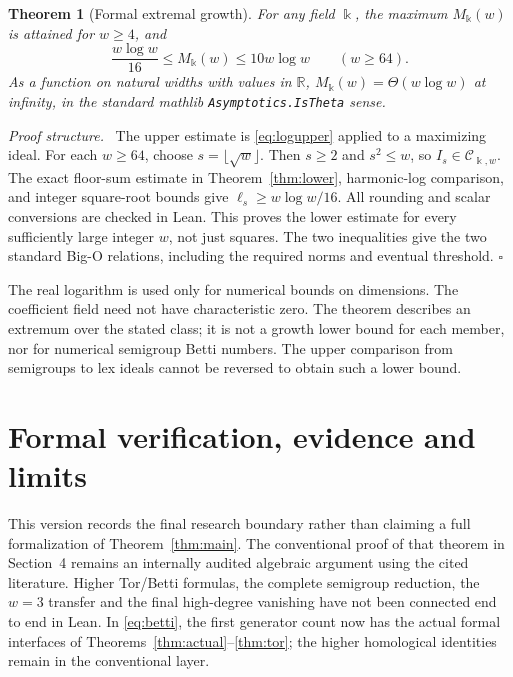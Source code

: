 \documentclass[11pt,a4paper]{article}
\newtheorem{theorem}{Theorem}[section]
\newenvironment{proof}[1][Proof]{\par\noindent\textit{#1.}\ \ignorespaces}{\unskip\nobreak\hfill\ensuremath{\square}\par}
\newcommand{\kk}{\Bbbk}
\begin{document}
\begin{theorem}[Formal extremal growth]\label{thm:theta}
For any field $\kk$, the maximum $M_{\kk}(w)$ is attained for $w\ge4$, and
\[
 \frac{w\log w}{16}\le M_{\kk}(w)\le10w\log w\qquad(w\ge64).
\]
As a function on natural widths with values in $\mathbb R$,
$M_{\kk}(w)=\Theta(w\log w)$ at infinity, in the standard mathlib
\texttt{Asymptotics.IsTheta} sense.
\end{theorem}
\begin{proof}[Proof structure]
The upper estimate is \eqref{eq:logupper} applied to a maximizing ideal.
For each $w\ge64$, choose $s=\lfloor\sqrt w\rfloor$. Then $s\ge2$ and
$s^2\le w$, so $I_s\in\mathcal C_{\kk,w}$. The exact floor-sum estimate in
Theorem~\ref{thm:lower}, harmonic-log comparison, and integer square-root
bounds give $\ell_s\ge w\log w/16$. All rounding and scalar conversions
are checked in Lean. This proves the lower estimate for every sufficiently
large integer $w$, not just squares. The two inequalities give the two standard
Big-O relations, including the required norms and eventual threshold.
\end{proof}
The real logarithm is used only for numerical bounds on dimensions. The
coefficient field need not have characteristic zero. The theorem describes
an extremum over the stated class; it is not a growth lower bound for each
member, nor for numerical semigroup Betti numbers. The upper comparison from
semigroups to lex ideals cannot be reversed to obtain such a lower bound.

\section{Formal verification, evidence and limits}\label{sec:formal}
This version records the final research boundary rather than claiming a full
formalization of Theorem~\ref{thm:main}. The conventional proof of that theorem
in Section~4 remains an internally audited algebraic argument using the cited
literature. Higher Tor/Betti formulas, the complete semigroup reduction,
the $w=3$ transfer and the final high-degree vanishing have not been connected
end to end in Lean. In \eqref{eq:betti}, the first generator count now has the
actual formal interfaces of Theorems~\ref{thm:actual}--\ref{thm:tor}; the higher
homological identities remain in the conventional layer.
\end{document}
